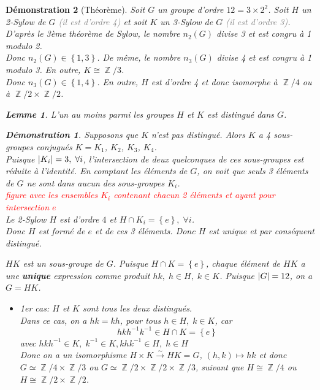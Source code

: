 \documentclass[a4paper, oneside]{report}
\theoremstyle{break}
\newtheorem{lemme}[thm]{Lemme}
\newtheorem*{demonstration}{Démonstration}
\newcommand{\gray}[1]{\textcolor{gray}{#1}}
\newcommand{\red}[1]{\textcolor{red}{#1}}
\newcommand{\x}{\times}
\newcommand{\fong}{\overset{\sim}{\rightarrow}}
\DeclareMathOperator{\Z}{\mathbb{Z}}
\DeclarePairedDelimiter\ens{\left\{ }{\right\} }%
\DeclarePairedDelimiter\abs{\lvert}{\rvert}%
\renewcommand{\ens}[1]{\left\{ #1 \right\} }%
\begin{document}
\begin{demonstration}[Théorème]

Soit $G$ un groupe d'ordre $12 = 3 \times 2^2$. Soit $H$ un 2-Sylow de $G$ \gray{(il est d'ordre 4)} et soit $K$ un 3-Sylow de $G$ \gray{(il est d'ordre 3)}. D'après le 3ème théorème de Sylow, le nombre $n_2(G)$ divise 3 et est congru à 1 modulo 2.\\
Donc $n_2(G) \in \ens{1, 3}$. De même, le nombre $n_3(G)$ divise 4 et est congru à 1 modulo 3. En outre, $K\cong \Z/3$.\\
Donc $n_3(G) \in \ens{1, 4}$. En outre, $H$ est d'ordre 4 et donc isomorphe à $\Z/4$ ou à $\Z/2 \times \Z/2$.

\begin{lemme}
L'un au moins parmi les groupes $H$ et $K$ est distingué dans $G$.
\end{lemme}

\begin{demonstration}
Supposons que $K$ n'est pas distingué. Alors $K$ a 4 sous-groupes conjugués $K = K_1$, $K_2$, $K_3$, $K_4$.\\
Puisque $\abs{K_i} = 3, \; \forall i$, l'intersection de deux quelconques de ces sous-groupes est réduite à l'identité. En comptant les éléments de $G$, on voit que seuls 3 éléments de $G$ ne sont dans aucun des sous-groupes $K_i$.\\

\red{figure avec les ensembles $K_i$ contenant chacun 2 éléments et ayant pour intersection $e$}\\

Le 2-Sylow $H$ est d'ordre $4$ et $H \cap K_i = \ens{e}, \; \forall i$.\\
Donc $H$ est formé de $e$ et de ces 3 éléments. Donc $H$ est unique et par conséquent distingué.
\end{demonstration}

$HK$ est un sous-groupe de $G$. Puisque $H \cap K = \ens{e}$, chaque élément de $HK$ a une \textbf{unique} expression comme produit $hk, \; h \in H, \; k \in K$. Puisque $\abs{G} = 12$, on a $G = HK$.



\begin{itemize}
\item 1er cas: $H$ et $K$ sont tous les deux distingués.\\
Dans ce cas, on a $hk = kh$, pour tous $h \in H, \; k \in K$, car	
$$hkh^{-1}k^{-1} \in  H \cap K = \ens{e}$$
avec $hkh^{-1} \in K, \; k^{-1} \in K, khk^{-1} \in H, \; h \in H$\\
Donc on a un isomorphisme $H \times K \fong HK = G$, $(h,k)\mapsto hk$ et donc $G \simeq \Z/4 \times \Z/3$ ou $G \simeq \Z/2 \times \Z/2 \times \Z/3$, suivant que $H\cong \Z/4$ ou $H\cong \Z/2\x \Z/2$.


\end{itemize}
\end{demonstration}
\end{document}
